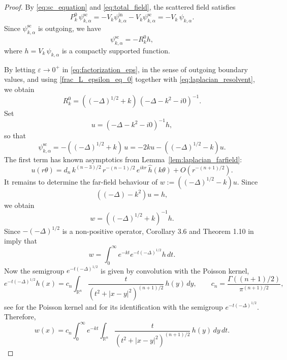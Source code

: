 \documentclass[12pt,a4paper]{amsart}
\numberwithin{equation}{section}
\theoremstyle{plain}
\theoremstyle{definition}
\begin{document}
\begin{proof}
By \eqref{eq:sc_equation} and \eqref{eq:total_field}, the scattered field
satisfies
\begin{equation*}
    P_k^0\,\psi^{\mathrm{sc}}_{k,\alpha}
    =
    -V_k\psi^{\mathrm{in}}_{k,\alpha}-V_k\psi^{\mathrm{sc}}_{k,\alpha}
    =
    -V_k\,\psi_{k,\alpha}.
\end{equation*}
Since $\psi^{\mathrm{sc}}_{k,\alpha}$ is outgoing, we have
\begin{equation*}
    \psi^{\mathrm{sc}}_{k,\alpha}
    =
    -R_k^0 h,
\end{equation*}
where $h = V_k\,\psi_{k,\alpha}$ is a compactly supported function.

By letting $\varepsilon\to0^+$ in \eqref{eq:factorization_eps}, in the sense
of outgoing boundary values, and using \eqref{frac_L_epsilon_eq_0} together
with \eqref{eq:laplacian_resolvent}, we obtain
\begin{equation*}
    R_k^0 = ((-\Delta)^{1/2}+k)\,(-\Delta - k^2 - i0)^{-1}.
\end{equation*}
Set 
\begin{equation*}
    u = (-\Delta - k^2 - i0)^{-1}h,
\end{equation*}
so that
\begin{equation}\label{eq:sc_factor}
\psi^{\mathrm{sc}}_{k,\alpha} = -((-\Delta)^{1/2}+k)\,u
=
 - 2ku - ((-\Delta)^{1/2}-k)u.
\end{equation}
The first term has known asymptotics from Lemma~\ref{lem:laplacian_farfield}:
\begin{equation}\label{eq:u_farfield}
u(r\theta) = d_n\, k^{(n-3)/2}\, r^{-(n-1)/2}\, e^{ikr}\,\hat{h}(k\theta)
+ O(r^{-(n+1)/2}).
\end{equation}
It remains to determine the far-field behaviour of $w:=((-\Delta)^{1/2}-k)u$. Since 
\begin{equation*}
    ((-\Delta) - k^2)u = h,
\end{equation*}
we obtain 
\begin{equation*}
    w=((-\Delta)^{1/2}+k)^{-1}h.
\end{equation*}
Since $-(-\Delta)^{1/2}$ is a non-positive operator, Corollary 3.6 and Theorem 1.10 in \cite{EngelNagel} imply that 
\begin{equation*}
    w
    =
    \int_0^\infty e^{-kt} e^{-t(-\Delta)^{1/2}}h\,dt.
\end{equation*}
Now the semigroup $e^{-t(-\Delta)^{1/2}}$ is given by convolution with the Poisson kernel,
\begin{equation*}
    e^{-t(-\Delta)^{1/2}}h(x)
    =
    c_n\int_{\mathbb{R}^n}
    \frac{t}{(t^2+|x-y|^2)^{(n+1)/2}}\,h(y)\,dy,
    \qquad
    c_n=\frac{\Gamma((n+1)/2)}{\pi^{(n+1)/2}},
\end{equation*}
see \cite[Chapter III, \S2, Proposition 5]{Stein1970} for the Poisson kernel and \cite[Proposition 16.4]{Garofalo2019} for its identification with the semigroup $e^{-t(-\Delta)^{1/2}}$. Therefore,
\begin{equation*}
    w(x)
    =
    c_n\int_0^\infty e^{-kt}
    \int_{\mathbb{R}^n}
    \frac{t}{(t^2+|x-y|^2)^{(n+1)/2}}\,h(y)\,dy\,dt.
\end{equation*}




\end{proof}
\end{document}
